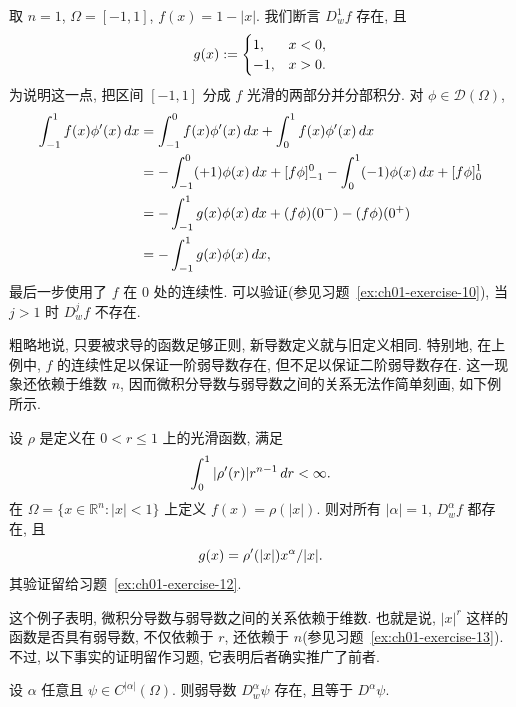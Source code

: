 \begin{Example}
\label{ex:ch01-absolute-value-weak-derivative}
取 $n=1$, $\Omega=[-1,1]$, $f(x)=1-|x|$. 我们断言 $D_w^1f$ 存在, 且
\[
\MathBookFormulaID{formula-ch01-absolute-value-weak-derivative}
g(x):=\begin{cases}1,&x<0,\\-1,&x>0.
\end{cases}
\]
为说明这一点, 把区间 $[-1,1]$ 分成 $f$ 光滑的两部分并分部积分. 对 $\phi\in\mathcal D(\Omega)$,
\[
\MathBookFormulaID{formula-ch01-piecewise-integration-by-parts}
\begin{aligned}
\int_{-1}^1f(x)\phi'(x)\,dx
&=\int_{-1}^0f(x)\phi'(x)\,dx+\int_0^1f(x)\phi'(x)\,dx\\
&=-\int_{-1}^0(+1)\phi(x)\,dx+[f\phi]_{-1}^0
  -\int_0^1(-1)\phi(x)\,dx+[f\phi]_0^1\\
&=-\int_{-1}^1g(x)\phi(x)\,dx+(f\phi)(0^-)-(f\phi)(0^+)\\
&=-\int_{-1}^1g(x)\phi(x)\,dx,
\end{aligned}
\]
最后一步使用了 $f$ 在 $0$ 处的连续性. 可以验证(参见习题~\ref{ex:ch01-exercise-10}), 当 $j>1$ 时 $D_w^jf$ 不存在.
\end{Example}

粗略地说, 只要被求导的函数足够正则, 新导数定义就与旧定义相同. 特别地, 在上例中, $f$ 的连续性足以保证一阶弱导数存在, 但不足以保证二阶弱导数存在. 这一现象还依赖于维数 $n$, 因而微积分导数与弱导数之间的关系无法作简单刻画, 如下例所示.

\begin{Example}
\label{ex:ch01-radial-weak-derivative}
设 $\rho$ 是定义在 $0<r\leq1$ 上的光滑函数, 满足
\[
\MathBookFormulaID{formula-ch01-radial-derivative-integrability}
\int_0^1|\rho'(r)|r^{n-1}\,dr<\infty.
\]
在 $\Omega=\{x\in\mathbb R^n:|x|<1\}$ 上定义 $f(x)=\rho(|x|)$. 则对所有 $|\alpha|=1$, $D_w^\alpha f$ 都存在, 且
\[
\MathBookFormulaID{formula-ch01-radial-weak-derivative}
g(x)=\rho'(|x|)x^\alpha/|x|.
\]
其验证留给习题~\ref{ex:ch01-exercise-12}.
\end{Example}

这个例子表明, 微积分导数与弱导数之间的关系依赖于维数. 也就是说, $|x|^r$ 这样的函数是否具有弱导数, 不仅依赖于 $r$, 还依赖于 $n$(参见习题~\ref{ex:ch01-exercise-13}). 不过, 以下事实的证明留作习题, 它表明后者确实推广了前者.

\begin{Proposition}
\label{prop:ch01-classical-equals-weak}
设 $\alpha$ 任意且 $\psi\in C^{|\alpha|}(\Omega)$. 则弱导数 $D_w^\alpha\psi$ 存在, 且等于 $D^\alpha\psi$.
\end{Proposition}

